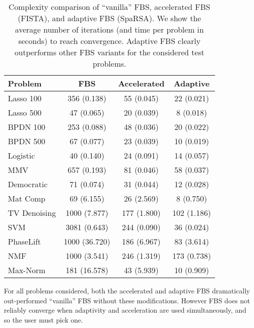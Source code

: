 \documentclass{amsart}
\theoremstyle{definition}
\begin{document}
 \begin{table}[t]
\centering
\caption{Complexity comparison of ``vanilla'' FBS, accelerated FBS (FISTA), and adaptive FBS (SpaRSA). We show the average number of iterations (and time per problem in seconds) to reach convergence. Adaptive FBS clearly outperforms other FBS variants for the considered test problems. \vspace{-5mm}} \label{kickasstable}
\vskip 0.15in
\begin{small}
\begin{tabular}{lccc}
\toprule
Problem & FBS & Accelerated &  Adaptive \\
\midrule
Lasso 100 &	  356 (0.138) & 	   55 (0.045) & 	   22 (0.021) \\
Lasso 500 &	   47 (0.065) & 	   20 (0.039) & 	    8 (0.018) \\
BPDN 100 &	  253 (0.088) & 	   48 (0.036) & 	   20 (0.022) \\
BPDN 500 &	   67 (0.077) & 	   23 (0.039) & 	   10 (0.019) \\
Logistic &	   40 (0.140) & 	   24 (0.091) & 	   14 (0.057) \\
MMV &	  657 (0.193) & 	   81 (0.046) & 	   58 (0.037) \\
Democratic &	   71 (0.074) & 	   31 (0.044) & 	   12 (0.028) \\
Mat Comp &	   69 (6.155) & 	   26 (2.569) & 	    8 (0.750) \\
TV Denoising &	 1000 (7.877) & 	  177 (1.800) & 	  102 (1.186) \\
SVM &	 3081 (0.643) & 	  244 (0.090) & 	   36 (0.024) \\
PhaseLift &	 1000 (36.720) & 	  186 (6.967) & 	   83 (3.614) \\
NMF &	 1000 (3.541) & 	  246 (1.319) & 	  173 (0.738) \\
Max-Norm &	  181 (16.578) & 	   43 (5.939) & 	   10 (0.909) \\
\bottomrule
\end{tabular}
\vspace{-2mm}
\end{small}
\end{table}




For all problems considered, both the accelerated and adaptive FBS dramatically out-performed ``vanilla'' FBS without these modifications.  However FBS does not reliably converge when adaptivity and acceleration are used simultaneously, and so the user must pick one.
\end{document}
